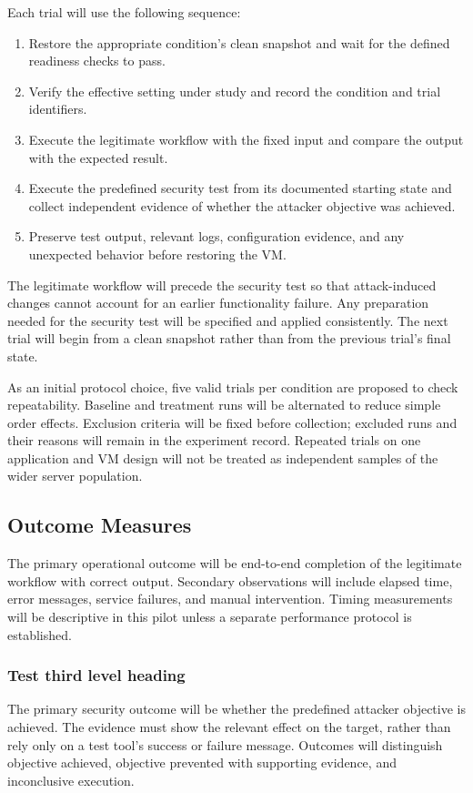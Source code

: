 \documentclass[12pt,letterpaper]{article}
\begin{document}
Each trial will use the following sequence:

\begin{enumerate}
\item Restore the appropriate condition's clean snapshot and wait for the defined readiness checks to pass.
\item Verify the effective setting under study and record the condition and trial identifiers.
\item Execute the legitimate workflow with the fixed input and compare the output with the expected result.
\item Execute the predefined security test from its documented starting state and collect independent evidence of whether the attacker objective was achieved.
\item Preserve test output, relevant logs, configuration evidence, and any unexpected behavior before restoring the VM.
\end{enumerate}

The legitimate workflow will precede the security test so that attack-induced changes cannot account for an earlier functionality failure. Any preparation needed for the security test will be specified and applied consistently. The next trial will begin from a clean snapshot rather than from the previous trial's final state.

As an initial protocol choice, five valid trials per condition are proposed to check repeatability. Baseline and treatment runs will be alternated to reduce simple order effects. Exclusion criteria will be fixed before collection; excluded runs and their reasons will remain in the experiment record. Repeated trials on one application and VM design will not be treated as independent samples of the wider server population.
\subsection{Outcome Measures}
\label{sec:org4d5cdfb}

The primary operational outcome will be end-to-end completion of the legitimate workflow with correct output. Secondary observations will include elapsed time, error messages, service failures, and manual intervention. Timing measurements will be descriptive in this pilot unless a separate performance protocol is established.
\subsubsection{Test third level heading}
\label{sec:orgc844f01}
The primary security outcome will be whether the predefined attacker objective is achieved. The evidence must show the relevant effect on the target, rather than rely only on a test tool's success or failure message. Outcomes will distinguish objective achieved, objective prevented with supporting evidence, and inconclusive execution.
\end{document}
